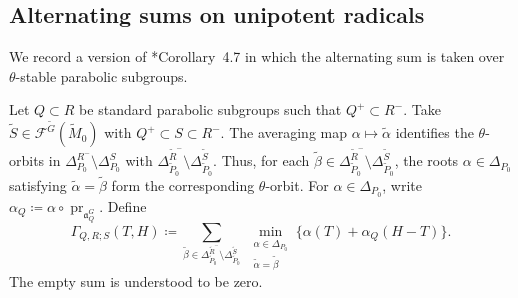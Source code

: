 \documentclass[12pt]{amsart}
\theoremstyle{definition}
\theoremstyle{plain}
\theoremstyle{remark}
\newcommand{\fa}{\mathfrak{a}}
\newcommand{\cF}{\mathcal{F}}
\numberwithin{equation}{section}
\newcommand{\tG}{\widetilde{G}}
\newcommand{\tM}{\widetilde{M}}
\newcommand{\tP}{\widetilde{P}}
\newcommand{\tR}{\widetilde{R}}
\newcommand{\tS}{\widetilde{S}}
\newcommand{\talpha}{\widetilde{\alpha}}
\newcommand{\tbeta}{\widetilde{\beta}}
\begin{document}
\subsection{Alternating sums on unipotent radicals}

We record a version of \cite{FL16}*{Corollary~4.7} in which
the alternating sum is taken over $\theta$-stable parabolic
subgroups.

Let $Q\subset R$ be standard parabolic subgroups such that
$Q^+\subset R^-$.
Take $\tS\in \cF^{\tG}(\tM_0)$ with $Q^+\subset S\subset R^-$. 
The averaging map $\alpha\mapsto\talpha$ identifies the
$\theta$-orbits in
$\Delta_{P_0}^{R^-}\setminus\Delta_{P_0}^{S}$ with
$\Delta_{\tP_0}^{\tR^-}\setminus\Delta_{\tP_0}^{\tS}$.
Thus, for each
$\tbeta\in\Delta_{\tP_0}^{\tR^-}\setminus\Delta_{\tP_0}^{\tS}$,
the roots $\alpha\in\Delta_{P_0}$ satisfying
$\talpha=\tbeta$ form the corresponding $\theta$-orbit.
For $\alpha\in\Delta_{P_0}$, write
$\alpha_Q\coloneqq \alpha\circ\operatorname{pr}_{\fa_Q^G}$.
Define
\begin{equation}
 \Gamma_{Q,R;S}(T,H)
   \coloneqq\sum_{\tbeta\in
       \Delta_{\tP_0}^{\tR^-}\setminus\Delta_{\tP_0}^{\tS}}
       \ \min_{\substack{\alpha\in\Delta_{P_0}\\
                         \talpha=\tbeta}}
       \bigl\{\alpha(T)+\alpha_{Q}(H-T)\bigr\}.
 \label{eq:tfl47-gamma}
\end{equation}
The empty sum is understood to be zero.
\end{document}

